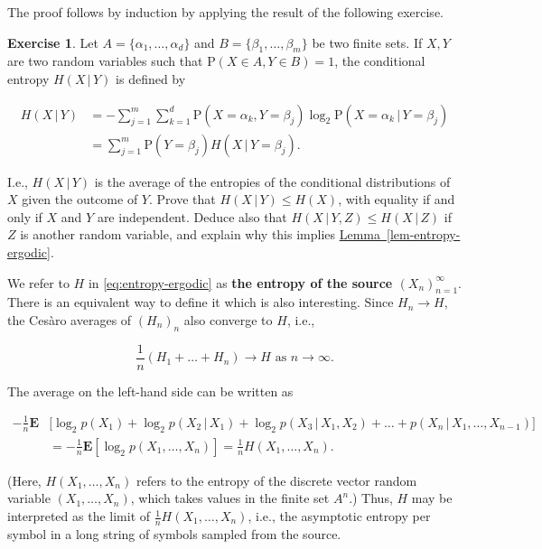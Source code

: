 \documentclass[11pt]{report}
\theoremstyle{plain}
\theoremstyle{definition}
\newtheorem{xexercise}[thm]{Exercise}
\begin{document}
\noindent The proof follows by induction by applying the result
of the following exercise.

\begin{xexercise}
Let $A=\{\alpha_1,\ldots,\alpha_d \}$ and
$B=\{\beta_1,\ldots,\beta_m \}$ be two finite sets.
If $X,Y$ are two random variables such that
$\mathrm{P}(X\in A, Y\in B)=1$, the conditional
entropy $H(X\,|\,Y)$ is defined by

\begin{align*}
H(X\,|\,Y) &= -\sum_{j=1}^m \sum_{k=1}^d \mathrm{P}(X=\alpha_k, Y=\beta_j) \log_2 \mathrm{P}(X = \alpha_k\,|\,Y=\beta_j) \\
&= \sum_{j=1}^m \mathrm{P}(Y=\beta_j) H(X\,|\,Y=\beta_j).
\end{align*}

\noindent I.e., $H(X\,|\,Y)$ is the average of the entropies of
the conditional distributions of $X$ given the
outcome of $Y$. Prove that $H(X\,|\,Y) \le H(X)$,
with equality if and only if $X$ and $Y$ are
independent. Deduce also that
$H(X\,|\,Y,Z) \le H(X\,|\,Z)$ if $Z$ is another
random variable, and explain why this implies \texorpdfstring{\hyperref[lem-entropy-ergodic]{Lemma~\ref*{lem-entropy-ergodic}}}{Lemma}.
\end{xexercise}

\noindent We refer to $H$ in \eqref{eq:entropy-ergodic} as \textbf{the
entropy of the source $(X_n)_{n=1}^\infty$}. There is
an equivalent way to define it which is also
interesting. Since $H_n\to H$, the Ces\`aro averages
of $(H_n)_n$ also converge to $H$, i.e.,

\[
\frac{1}{n}(H_1+\ldots+H_n) \to H \textrm{ as }n\to\infty.
\]

\noindent The average on the left-hand side can be written as

\begin{align*}
-\frac1n \mathbf{E}&\Big[ \log_2 p(X_1) + \log_2 p(X_2\,|\,X_1)
+ \log_2 p(X_3\,|\,X_1,X_2) + \ldots + p(X_n\,|\,X_1,\ldots,X_{n-1}) \Big] \\
&= -\frac1n \mathbf{E} \left[\log_2 p(X_1,\ldots,X_n)\right] = \frac{1}{n}H(X_1,\ldots,X_n).
\end{align*}

\noindent (Here, $H(X_1,\ldots,X_n)$ refers to the entropy of
the discrete vector random variable
$(X_1,\ldots,X_n)$, which takes values in the finite
set $A^n$.) Thus, $H$ may be interpreted as the limit
of $\frac{1}{n} H(X_1,\ldots,X_n)$, i.e., the
asymptotic entropy per symbol in a long string of
symbols sampled from the source.
\end{document}
